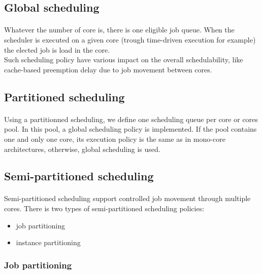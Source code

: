 \subsection{Global scheduling}

\paragraph{}
Whatever the number of core is, there is one eligible job queue. When the scheduler is executed on
a given core (trough time-driven execution for example) the elected job is load in the core.\\
Such scheduling policy have various impact on the overall schedulability, like cache-based
preemption delay due to job movement between cores.

\subsection{Partitioned scheduling}

\paragraph{}
Using a partitionned scheduling, we define one scheduling queue per core or cores pool. In
this pool, a global scheduling policy is implemented. If the pool contains one and only one core,
its execution policy is the same as in mono-core architectures, otherwise, global scheduling is
used.

\subsection{Semi-partitioned scheduling}

\paragraph{}
Semi-partitioned scheduling support controlled job movement through multiple cores. There is two
types of semi-partitioned scheduling policies:
\begin{itemize}
\item job partitioning
\item instance partitioning
\end{itemize}

\subsubsection{Job partitioning}

